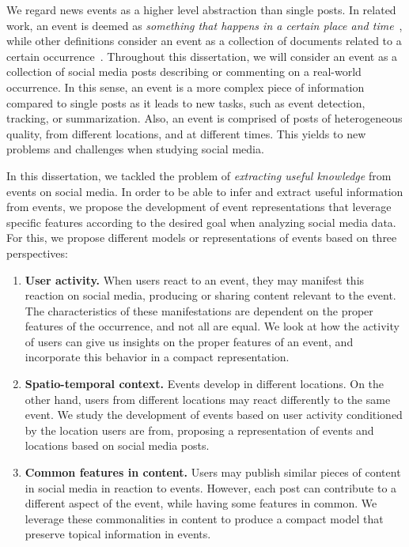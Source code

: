 \documentclass[runningheads]{llncs}
\begin{document}

We regard news events as a higher level abstraction than single posts.
%
In related work, an event is deemed as {\em something that happens in a certain
place and time}~\cite{yang1999learning}, while other definitions consider an
event as a collection of documents related to a certain
occurrence~\cite{Becker:2010:LSM:1718487.1718524}.
%
Throughout this dissertation, we will consider an event as a collection of
social media posts describing or commenting on a real-world occurrence.
%
In this sense, an event is a more complex piece of information compared to
single posts as it leads to new tasks, such as event detection, tracking, or
summarization.
%
Also, an event is comprised of posts of heterogeneous quality, from different
locations, and at different times.
%
This yields to new problems and challenges when studying social media.



In this dissertation, we tackled the problem of {\em extracting useful
knowledge} from events on social media. 
%
In order to be able to infer and extract useful information from events, we
propose the development of event representations that leverage specific features
according to the desired goal when analyzing social media data.
%
For this, we propose different models or representations of events based on
three perspectives:
%

\begin{enumerate}
    \item {\bf User activity.} 
    When users react to an event, they may manifest this reaction on social
    media, producing or sharing content relevant to the event. 
    The characteristics of these manifestations are dependent on the proper
    features of the occurrence, and not all are equal. 
    We look at how the activity of users can give us insights on the proper
    features of an event, and incorporate this behavior in a compact
    representation.

    \item {\bf Spatio-temporal context.} 
    Events develop in different locations. 
    On the other hand, users from different locations may react differently to
    the same event.
    We study the development of events based on user activity conditioned by the
    location users are from, proposing a representation of events and locations
    based on social media posts.

    \item {\bf Common features in content.} 
    Users may publish similar pieces of content in social media in reaction to
    events.
    However, each post can contribute to a different aspect of the event, while
    having some features in common.
    We leverage these commonalities in content to produce a compact model that
    preserve topical information in events.
    
\end{enumerate}
\end{document}
